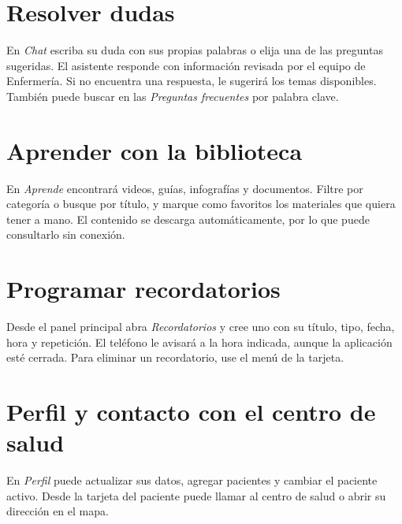 
\section{Resolver dudas}

En \emph{Chat} escriba su duda con sus propias palabras o elija una de las
preguntas sugeridas. El asistente responde con información revisada por el
equipo de Enfermería. Si no encuentra una respuesta, le sugerirá los temas
disponibles. También puede buscar en las \emph{Preguntas frecuentes} por
palabra clave.


\section{Aprender con la biblioteca}

En \emph{Aprende} encontrará videos, guías, infografías y documentos. Filtre por
categoría o busque por título, y marque como favoritos los materiales que quiera
tener a mano. El contenido se descarga automáticamente, por lo que puede
consultarlo sin conexión.


\section{Programar recordatorios}

Desde el panel principal abra \emph{Recordatorios} y cree uno con su título,
tipo, fecha, hora y repetición. El teléfono le avisará a la hora indicada,
aunque la aplicación esté cerrada. Para eliminar un recordatorio, use el menú de
la tarjeta.


\section{Perfil y contacto con el centro de salud}

En \emph{Perfil} puede actualizar sus datos, agregar pacientes y cambiar el
paciente activo. Desde la tarjeta del paciente puede llamar al centro de salud o
abrir su dirección en el mapa.

